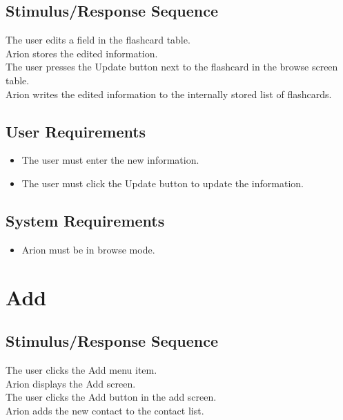 \documentclass{scrreprt}
\newcommand{\smallspace}{\vspace{0.5cm}}
\begin{document}
    \subsection*{Stimulus/Response Sequence}
        \begin{flushleft}
             The user edits a field in the flashcard table. \\
             Arion stores the edited information. \\
            \smallspace
             The user presses the Update button next to the flashcard in the browse screen table. \\
             Arion writes the edited information to the internally stored list of flashcards. \\
        \end{flushleft}
    \subsection*{User Requirements}
        \begin{itemize}
            \item The user must enter the new information.
            \item The user must click the Update button to update the information.
        \end{itemize}

    \subsection*{System Requirements}
        \begin{itemize}
            \item Arion must be in browse mode.
        \end{itemize}

\section{Add}
    \subsection*{Stimulus/Response Sequence}
        \begin{flushleft}
             The user clicks the Add menu item. \\
             Arion displays the Add screen. \\
            \smallspace
             The user clicks the Add button in the add screen. \\
             Arion adds the new contact to the contact list. \\
        \end{flushleft}
\end{document}
